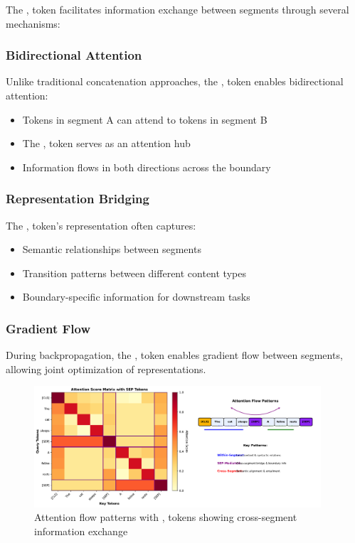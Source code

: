 The \sep{} token facilitates information exchange between segments through several mechanisms:

\subsubsection{Bidirectional Attention}
Unlike traditional concatenation approaches, the \sep{} token enables bidirectional attention:
\begin{itemize}
\item Tokens in segment A can attend to tokens in segment B
\item The \sep{} token serves as an attention hub
\item Information flows in both directions across the boundary
\end{itemize}

\subsubsection{Representation Bridging}
The \sep{} token's representation often captures:
\begin{itemize}
\item Semantic relationships between segments
\item Transition patterns between different content types
\item Boundary-specific information for downstream tasks
\end{itemize}

\subsubsection{Gradient Flow}
During backpropagation, the \sep{} token enables gradient flow between segments, allowing joint optimization of representations.

\begin{figure}[h]
\centering
\includegraphics[width=0.95\textwidth]{part1/chapter02/fig_sep_attention_flow.pdf}
\caption{Attention flow patterns with \sep{} tokens showing cross-segment information exchange}
\label{fig:sep_attention_flow}
\end{figure}

